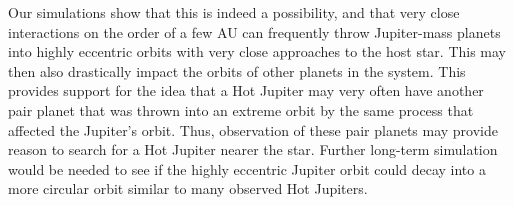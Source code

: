 \documentclass[12pt]{article}
\begin{document}
Our simulations show that this is indeed a possibility, and that very close
interactions on the order of a few AU can frequently throw Jupiter-mass planets into
highly eccentric orbits with very close approaches to the host star. 
This may then also drastically impact the orbits of other planets
in the system. This provides support for the idea that a Hot Jupiter may very
often have another pair planet that was thrown into an extreme orbit by the same
process that affected the Jupiter's orbit. Thus,
observation of these pair planets may provide reason to search for a Hot Jupiter
nearer the star.
Further long-term simulation would be needed to see if the highly eccentric Jupiter
orbit could decay into a more circular orbit similar to many observed Hot Jupiters.


\clearpage
\end{document}
